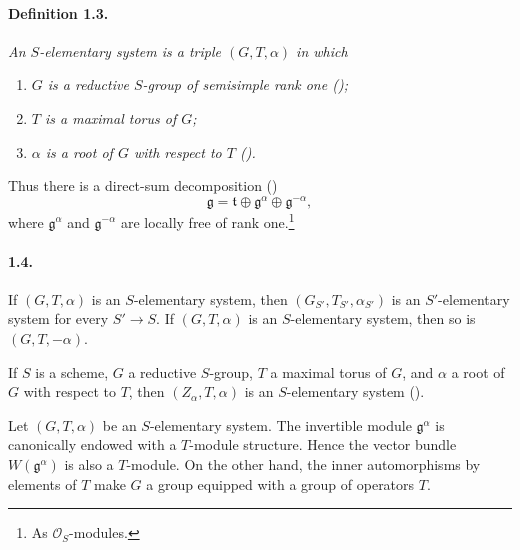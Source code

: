 \paragraph{\textbf{Definition 1.3.}}
\emph{An \(S\)-elementary system is a triple \((G,T,\alpha)\) in
which}
\begin{enumerate}
\item[\textup{(i)}] \emph{\(G\) is a reductive \(S\)-group of
  semisimple rank one \textup{()};}
\item[\textup{(ii)}] \emph{\(T\) is a maximal torus of \(G\);}
\item[\textup{(iii)}] \emph{\(\alpha\) is a root of \(G\) with
  respect to \(T\) \textup{()}.}
\end{enumerate}
Thus there is a direct-sum decomposition
\textup{()}
\[
  \mathfrak g=\mathfrak t\oplus\mathfrak g^\alpha
  \oplus\mathfrak g^{-\alpha},
\]
where \(\mathfrak g^\alpha\) and \(\mathfrak g^{-\alpha}\) are
locally free of rank one.\footnote{As
\(\mathcal O_S\)-modules.}

\paragraph{\textbf{1.4.}}
If \((G,T,\alpha)\) is an \(S\)-elementary system, then
\((G_{S'},T_{S'},\alpha_{S'})\) is an \(S'\)-elementary system for
every \(S'\to S\). If \((G,T,\alpha)\) is an \(S\)-elementary
system, then so is \((G,T,-\alpha)\).

If \(S\) is a scheme, \(G\) a reductive \(S\)-group, \(T\) a
maximal torus of \(G\), and \(\alpha\) a root of \(G\) with respect
to \(T\), then \((Z_\alpha,T,\alpha)\) is an \(S\)-elementary
system \textup{()}.

Let \((G,T,\alpha)\) be an \(S\)-elementary system. The invertible
module \(\mathfrak g^\alpha\) is canonically endowed with a
\(T\)-module structure. Hence the vector bundle
\(W(\mathfrak g^\alpha)\) is also a \(T\)-module. On the other hand,
the inner automorphisms by elements of \(T\) make \(G\) a group
equipped with a group of operators \(T\).



